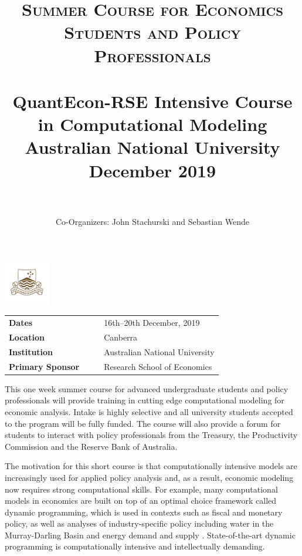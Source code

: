 \documentclass[12pt]{article}
\title{
		\usefont{OT1}{bch}{b}{n}
		\normalfont \normalsize \textsc{Summer Course for Economics Students and Policy Professionals} \\ [25pt]
		\horrule{1pt} \\[0.4cm]
		\huge QuantEcon-RSE Intensive Course in Computational Modeling \\
        \vspace{1em}
		\large Australian National University\\
		\large December 2019\\
		\horrule{1pt} \\[0.5cm]
}
\author{
		\normalfont \normalsize
        Co-Organizers: John Stachurski and Sebastian Wende \\[-3pt]		\normalsize
}
\date{}
\numberwithin{equation}{section}		%
\numberwithin{table}{section}				%
\begin{document}
\maketitle




\begin{center}
    \vspace{-2em}
    \includegraphics[width=2cm]{anu-logo-2.png}
    \vspace{1em}

    \begin{tabular}{ l  r r l}
        \textbf{Dates} & & &  16th--20th December, 2019\\
        \textbf{Location} & & &  Canberra \\
        \textbf{Institution} & & &  Australian National University \\
        \textbf{Primary Sponsor} & & &  Research School of Economics\\
    \end{tabular}
\end{center}

\bigskip
\bigskip

\noindent 
This one week summer course for advanced undergraduate students and policy
professionals will provide training in cutting edge computational modeling for
economic analysis.  Intake is highly selective and all university students
accepted to the program will be fully funded.  The course will also provide a
forum for students to interact with policy professionals from the Treasury,
the Productivity Commission and the Reserve Bank of Australia.

The motivation for this short course is that computationally intensive models
are increasingly used for applied policy analysis and, as a result, economic
modeling now requires strong computational skills.  For example, many
computational models in economics are built on top of an optimal choice
framework called dynamic programming, which is used in contexts such as fiscal
and monetary policy, as well as analyses of industry-specific policy including
water in the Murray-Darling Basin \citep{Grafton2011} and energy demand and
supply \citep{Ringkjob2018}.  State-of-the-art dynamic programming is
computationally intensive and intellectually demanding.
\end{document}
